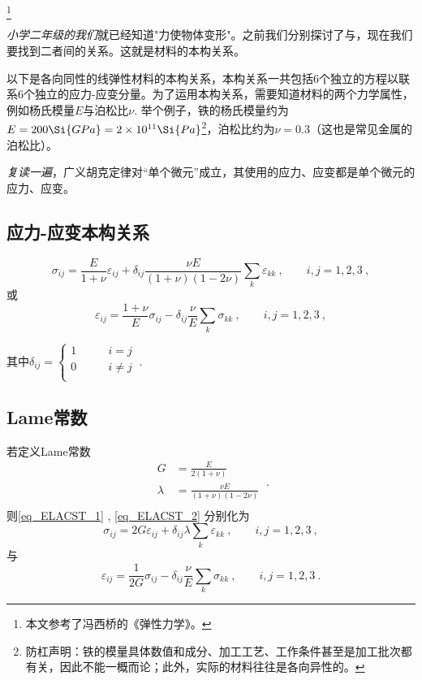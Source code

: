 
\begin{issues}
\issueDraft
\end{issues}
\footnote{本文参考了冯西桥的《弹性力学》。}

\textsl{小学二年级的我们}就已经知道"力使物体变形"。之前我们分别探讨了与，现在我们要找到二者间的关系。这就是材料的本构关系。

以下是各向同性的线弹性材料的本构关系，本构关系一共包括$6$个独立的方程以联系$6$个独立的应力-应变分量。为了运用本构关系，需要知道材料的两个力学属性，例如杨氏模量$E$与泊松比$\nu$. 举个例子，铁的杨氏模量约为$E = 200 \Si{GPa} = 2 \times 10^{11} \Si{Pa}$\footnote{防杠声明：铁的模量具体数值和成分、加工工艺、工作条件甚至是加工批次都有关，因此不能一概而论；此外，实际的材料往往是各向异性的。}，泊松比约为$\nu=0.3$（这也是常见金属的泊松比）。

\textsl{复读一遍}，广义胡克定律对“单个微元”成立，其使用的应力、应变都是单个微元的应力、应变。

\subsection{应力-应变本构关系}
\begin{equation}\label{eq_ELACST_1}
\sigma_{ij}=\frac{E}{1+\nu}\varepsilon_{ij}+\delta_{ij}\frac{\nu E}{(1+\nu)(1-2\nu)}\sum_k\varepsilon_{kk}~,\qquad i,j=1,2,3~,
\end{equation}
或
\begin{equation}\label{eq_ELACST_2}
\varepsilon_{ij}=\frac{1+\nu}{E}\sigma_{ij}-\delta_{ij}\frac{\nu}{E}\sum_k\sigma_{kk}~, \qquad i,j=1,2,3~,
\end{equation}

其中$\delta_{ij} = \left \{
\begin{aligned}
1 &\qquad i = j\\
0 &\qquad i \ne j\\
\end{aligned}~.
\right.
$

\subsection{Lame常数}
若定义Lame常数
\begin{equation}
\begin{aligned}
G&=\frac{E}{2(1+\nu)}\\
\lambda &= \frac{\nu E}{(1+\nu)(1-2\nu)}\\
\end{aligned}~.
\end{equation}
则\autoref{eq_ELACST_1} , \autoref{eq_ELACST_2} 分别化为
\begin{equation}
\sigma_{ij}=2G\varepsilon_{ij}+\delta_{ij}\lambda\sum_k\varepsilon_{kk}~,\qquad i,j=1,2,3~,
\end{equation}
与
\begin{equation}
\varepsilon_{ij}=\frac{1}{2G}\sigma_{ij}-\delta_{ij}\frac{\nu}{E}\sum_k\sigma_{kk}~, \qquad i,j=1,2,3~.
\end{equation}

